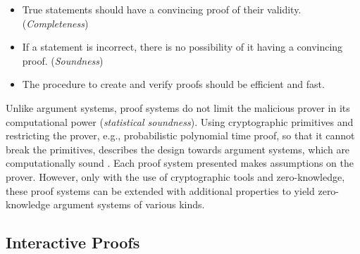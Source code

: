 \begin{itemize}
    \item True statements should have a convincing proof of their validity. (\textit{Completeness})
    \item If a statement is incorrect, there is no possibility of it having a convincing proof. (\textit{Soundness})
    \item The procedure to create and verify proofs should be efficient and fast.
\end{itemize}

Unlike argument systems, proof systems do not limit the malicious prover in its computational power (\textit{statistical soundness}). Using cryptographic primitives and restricting the prover, e.g., probabilistic polynomial time proof, so that it cannot break the primitives, describes the design towards argument systems, which are computationally sound \citep{ArgSystems, MicaliArgSys}. Each proof system presented makes assumptions on the prover. However, only with the use of cryptographic tools and zero-knowledge, these proof systems can be extended with additional properties to yield zero-knowledge argument systems of various kinds.

\begin{comment}
IPs are the basis to understand cryptographic protocols and argument systems
argument systems are IP with a specific assumption
polynomial IOPs together with polynomial commitment scheme always yields a specific argument of knowledge, can be made non interactive with fiat-shamir, can be succinct too, different abwandlungen
but before we need basic understanding on different proof systems that lie behind the construction of argument systems
then we need understanding of commitment scheme and fiat shamir transform
how zero knowledge is applied in the design will be shown later when going through the different systems

information secure = only theoretically
what are those, little history
1:polynomial IOPs 
- interactive proofs intro
- MIPs
- constant round IOPs
2:linear PCPs
-intro from the book Thaler-->combined with cryptographic primitives we get SNARKs, everything is a SNARK and SNARK variation
-Luong and Park: properties intro
- Yang Yang et al properties
-Soonhyeong 2021: better verification with EVM to verify non-maliciousness of blocks (zKSNARKS used)
\end{comment}

\subsection{Interactive Proofs}

